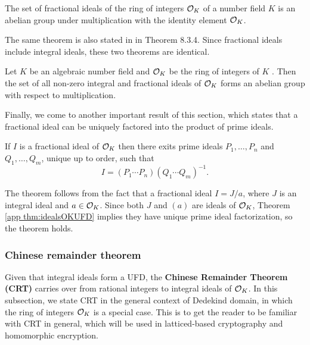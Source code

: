 \documentclass[../main.tex]{subfiles}
\begin{document}
\begin{theorem}
\label{app thm:fracIdealGroup}
\reversemarginpar
{}
The set of fractional ideals of the ring of integers $\mathcal{O}_K$ of a number field $K$ is an abelian group under multiplication with the identity element $\mathcal{O}_K$. 
\end{theorem}

The same theorem is also stated in \cite{alaca2004introductory} in Theorem 8.3.4. Since fractional ideals include integral ideals, these two theorems are identical. 
\begin{theorem}
Let $K$ be an algebraic number field and $\mathcal{O}_K$ be the ring of integers of $K$ . Then the set of all non-zero integral and fractional ideals of $\mathcal{O}_K$ forms an abelian group with respect to multiplication.
\end{theorem}

Finally, we come to another important result of this section, which states that a fractional ideal can be uniquely factored into the product of prime ideals. 


\begin{theorem}
\reversemarginpar
{}
If $I$ is a fractional ideal of $\mathcal{O}_K$ then there exits prime ideals $P_1, \dots, P_n$ and $Q_1, \dots, Q_m$, unique up to order, such that 
\begin{equation*}
    I = (P_1 \cdots P_n)(Q_1 \cdots Q_m)^{-1}.
\end{equation*}
\end{theorem}
The theorem follows from the fact that a fractional ideal $I=J/a$, where $J$ is an integral ideal and $a \in \mathcal{O}_K$. Since both $J$ and $(a)$ are ideals of $\mathcal{O}_K$, Theorem \ref{app thm:idealsOKUFD} implies they have unique prime ideal factorization, so the theorem holds.


\subsubsection{Chinese remainder theorem}
\label{app subsubsec:crt}
Given that integral ideals form a UFD, the \textbf{Chinese Remainder Theorem (CRT)} carries over from rational integers to integral ideals of $\mathcal{O}_K$. In this subsection, we state CRT in the general context of Dedekind domain, in which the ring of integers $\mathcal{O}_K$ is a special case. This is to get the reader to be familiar with CRT in general, which will be used in latticed-based cryptography and homomorphic encryption. 
\end{document}
